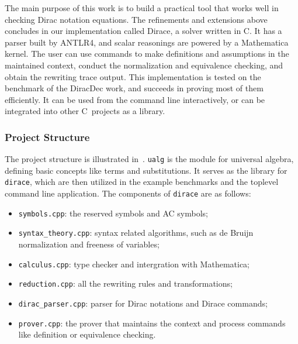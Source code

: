 \documentclass[runningheads]{llncs}
\newcommand{\CC}{C\nolinebreak\hspace{-.05em}\raisebox{.4ex}{\tiny\bf +}\nolinebreak\hspace{-.10em}\raisebox{.4ex}{\tiny\bf +}}
\def\CC{{C\nolinebreak[4]\hspace{-.05em}\raisebox{.4ex}{\tiny\bf ++}}}
\begin{document}
The main purpose of this work is to build a practical tool that works well in checking Dirac notation equations. The refinements and extensions above concludes in our implementation called Dirace, a solver written in \CC. It has a parser built by ANTLR4, and scalar reasonings are powered by a Mathematica kernel. The user can use commands to make definitions and assumptions in the maintained context, conduct the normalization and equivalence checking, and obtain the rewriting trace output. This implementation 
is tested on the benchmark of the DiracDec work, and succeeds in proving most of them efficiently. 
It can be used from the command line interactively, or can be integrated into other \CC\ projects as a library.

\subsubsection{Project Structure}
The project structure is illustrated in~.
\texttt{ualg} is the module for universal algebra, defining basic concepts like terms and substitutions. It serves as the library for \texttt{dirace}, which are then utilized in the example benchmarks and the toplevel command line application. The components of \texttt{dirace} are as follows:
\begin{itemize}
    \item \texttt{symbols.cpp}: the reserved symbols and AC symbols;
    \item \texttt{syntax\_theory.cpp}: syntax related algorithms, such as de Bruijn normalization and freeness of variables;
    \item \texttt{calculus.cpp}: type checker and intergration with Mathematica;
    \item \texttt{reduction.cpp}: all the rewriting rules and transformations;
    \item \texttt{dirac\_parser.cpp}: parser for Dirac notations and Dirace commands;
    \item \texttt{prover.cpp}: the prover that maintains the context and process commands like definition or equivalence checking.
\end{itemize}


\end{document}
